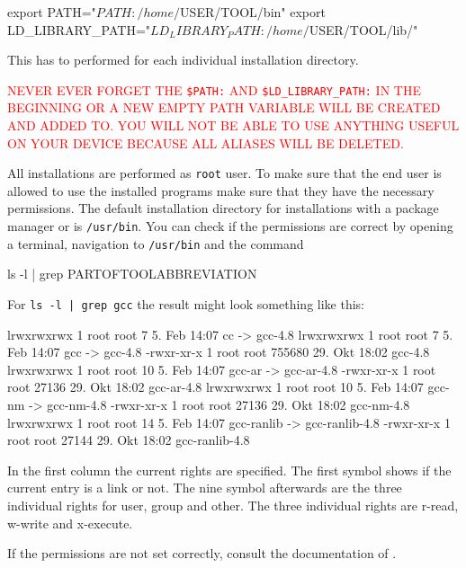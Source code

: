 \begin{code}
export PATH="$PATH:/home/$USER/TOOL/bin"
export LD_LIBRARY_PATH="$LD_LIBRARY_PATH:/home/$USER/TOOL/lib/"
\end{code}

This has to performed for each individual installation directory.

\textcolor{red}{NEVER EVER FORGET THE \texttt{\$PATH:} AND \texttt{\$LD\_LIBRARY\_PATH:} IN THE BEGINNING OR A NEW EMPTY PATH VARIABLE WILL BE CREATED AND ADDED TO. YOU WILL NOT BE ABLE TO USE ANYTHING USEFUL ON YOUR DEVICE BECAUSE ALL ALIASES WILL BE DELETED.}


All installations are performed as \verb+root+ user. To make sure that the end user is allowed to use the installed programs make sure that they have the necessary permissions. The default installation directory for installations with a package manager or \marktool{\zyppername} is \verb+/usr/bin+. You can check if the permissions are correct by opening a terminal, navigation to \verb+/usr/bin+ and the command

\begin{code}
ls -l | grep PARTOFTOOLABBREVIATION
\end{code}

For \verb+ls -l | grep gcc+ the result might look something like this:

\begingroup
\lstset{keepspaces=true}
\begin{code}
lrwxrwxrwx 1 root root      7  5. Feb 14:07 cc -> gcc-4.8
lrwxrwxrwx 1 root root      7  5. Feb 14:07 gcc -> gcc-4.8
-rwxr-xr-x 1 root root 755680 29. Okt 18:02 gcc-4.8
lrwxrwxrwx 1 root root     10  5. Feb 14:07 gcc-ar -> gcc-ar-4.8
-rwxr-xr-x 1 root root  27136 29. Okt 18:02 gcc-ar-4.8
lrwxrwxrwx 1 root root     10  5. Feb 14:07 gcc-nm -> gcc-nm-4.8
-rwxr-xr-x 1 root root  27136 29. Okt 18:02 gcc-nm-4.8
lrwxrwxrwx 1 root root     14  5. Feb 14:07 gcc-ranlib -> gcc-ranlib-4.8
-rwxr-xr-x 1 root root  27144 29. Okt 18:02 gcc-ranlib-4.8
\end{code}
\endgroup

In the first column the current rights are specified. The first symbol shows if the current entry is a link or not. The nine symbol afterwards are the three individual rights for user, group and other. The three individual rights are r-read, w-write and x-execute.

If the permissions are not set correctly, consult the documentation of . 